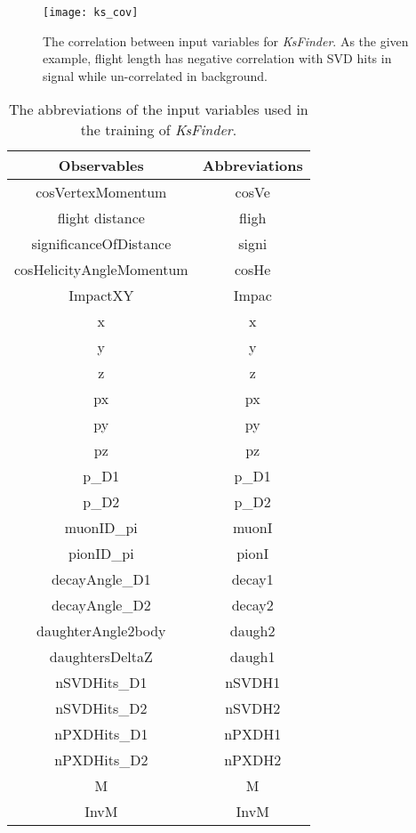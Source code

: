 \begin{figure}[ht]
\centering
\texttt{[image: ks\_cov]}
\caption{The correlation between input variables for \textit{KsFinder}. As the given example, flight length has negative correlation with SVD hits in signal while un-correlated in background.}
\label{fig:ks_cov}
\end{figure}

 \begin{table}[htpb]
 	\small
 	\begin{minipage}[ht]{1\linewidth}
 		\centering
 		\begin{tabular}{c|c}
 			\hline
 			Observables &  Abbreviations\\
 			\hline
 			cosVertexMomentum & cosVe \\
 			flight distance & fligh\\
 			significanceOfDistance & signi \\
 			cosHelicityAngleMomentum & cosHe\\
 			 			ImpactXY & Impac \\
 			x & x \\
 			y & y \\
 			z & z \\
 			px & px\\
 			py & py\\
 				pz & pz \\
 					p\_D1 & p\_D1\\
 				p\_D2 & p\_D2\\
 				muonID\_pi & muonI\\
 			pionID\_pi & pionI\\
 			decayAngle\_D1 & decay1 \\
 			decayAngle\_D2 & decay2\\
 			daughterAngle2body & daugh2\\
 			daughtersDeltaZ & daugh1\\
 				nSVDHits\_D1 & nSVDH1\\
 				nSVDHits\_D2 & nSVDH2\\
 				nPXDHits\_D1 &  nPXDH1 \\
 				nPXDHits\_D2 &  nPXDH2 \\
 				M & M \\
 			InvM & InvM \\
 			\hline
 		\end{tabular}
 	\end{minipage}
 
 \caption{The abbreviations of the input variables used in the training of \textit{KsFinder}.}
 \label{tab:ks_import}
 \end{table}

